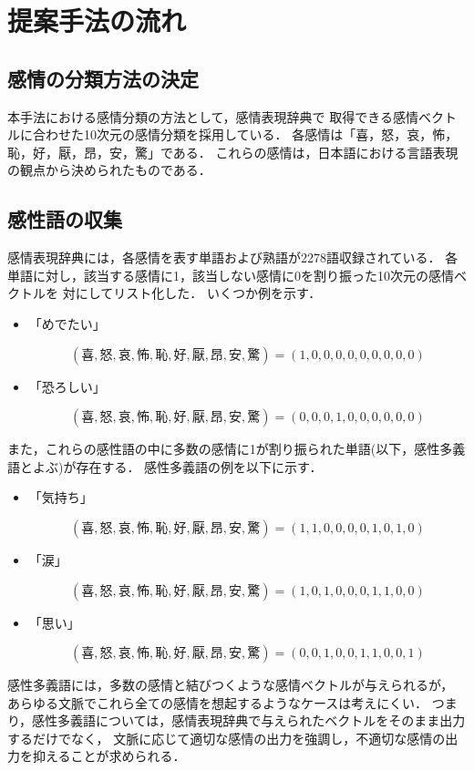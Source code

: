 	\section{提案手法の流れ}

		\subsection{感情の分類方法の決定}
			本手法における感情分類の方法として，感情表現辞典\cite{kanjou_hyogen_jiten}で
			取得できる感情ベクトルに合わせた10次元の感情分類を採用している．
			各感情は「喜，怒，哀，怖，恥，好，厭，昂，安，驚」である．
			これらの感情は，日本語における言語表現の観点から決められたものである．

		\subsection{感性語の収集}
			感情表現辞典には，各感情を表す単語および熟語が2278語収録されている．
			各単語に対し，該当する感情に1，該当しない感情に0を割り振った10次元の感情ベクトルを
			対にしてリスト化した．
			いくつか例を示す．
			\begin{itemize}
				\item 「めでたい」
				\par $$(喜, 怒, 哀, 怖, 恥, 好, 厭, 昂, 安, 驚)=(1, 0, 0, 0, 0, 0, 0, 0, 0, 0)$$
				\item 「恐ろしい」
				\par $$(喜, 怒, 哀, 怖, 恥, 好, 厭, 昂, 安, 驚)=(0, 0, 0, 1, 0, 0, 0, 0, 0, 0)$$
			\end{itemize}

			また，これらの感性語の中に多数の感情に1が割り振られた単語(以下，感性多義語とよぶ)が存在する．
			感性多義語の例を以下に示す．
			\begin{itemize}
				\item 「気持ち」
				\par $$(喜, 怒, 哀, 怖, 恥, 好, 厭, 昂, 安, 驚)=(1, 1, 0, 0, 0, 0, 1, 0, 1, 0)$$
				\item 「涙」
				\par $$(喜, 怒, 哀, 怖, 恥, 好, 厭, 昂, 安, 驚)=(1, 0, 1, 0, 0, 0, 1, 1, 0, 0)$$
				\item 「思い」
				\par $$(喜, 怒, 哀, 怖, 恥, 好, 厭, 昂, 安, 驚)=(0, 0, 1, 0, 0, 1, 1, 0, 0, 1)$$
			\end{itemize}

			感性多義語には，多数の感情と結びつくような感情ベクトルが与えられるが，
			あらゆる文脈でこれら全ての感情を想起するようなケースは考えにくい．
			つまり，感性多義語については，感情表現辞典で与えられたベクトルをそのまま出力するだけでなく，
			文脈に応じて適切な感情の出力を強調し，不適切な感情の出力を抑えることが求められる．
			
